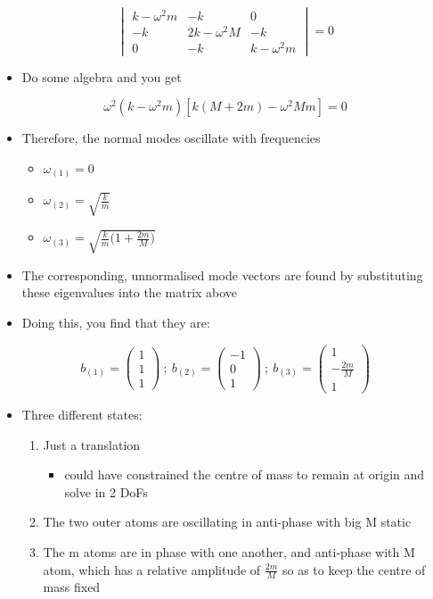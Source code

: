 \documentclass[a4paper,11pt,normalem]{article}
\begin{document}
\begin{example}
\[
    \begin{vmatrix} k - \omega^2 m & -k & 0 \\ -k & 2k - \omega^2 M & -k \\ 0 & -k & k - \omega^2 m \end{vmatrix} = 0
\]

\begin{itemize}
\item
  Do some algebra and you get
\end{itemize}

\[
    \omega^2 (k - \omega^2 m)[k(M + 2m) - \omega^2 Mm] = 0
\]

\begin{itemize}
\item
  Therefore, the normal modes oscillate with frequencies
  \begin{itemize}
  \item
    \(\omega_{(1)} = 0\)
  \item
    \(\omega_{(2)} = \sqrt{\frac{k}{m}}\)
  \item
    \(\omega_{(3)} = \sqrt{\frac{k}{m}\big(1 + \frac{2m}{M}\big)}\)
  \end{itemize}
\item
  The corresponding, unnormalised mode vectors are found by substituting
  these eigenvalues into the matrix above
\item
  Doing this, you find that they are:
\end{itemize}

\[
    b_{(1)} = \begin{pmatrix} 1 \\ 1 \\ 1 \end{pmatrix} ~;~ b_{(2)} = \begin{pmatrix} -1 \\ 0 \\ 1 \end{pmatrix} ~;~ b_{(3)} = \begin{pmatrix} 1 \\ -\frac{2m}{M} \\ 1 \end{pmatrix}
\]

\begin{itemize}
\item
  Three different states:
  \begin{enumerate}
  \item
    Just a translation
    \begin{itemize}
    \item
      could have constrained the centre of mass to remain at origin and
      solve in 2 DoFs
    \end{itemize}
  \item
    The two outer atoms are oscillating in anti-phase with big M static
  \item
    The m atoms are in phase with one another, and anti-phase with M
    atom, which has a relative amplitude of \(\frac{2m}{M}\) so as to
    keep the centre of mass fixed
  \end{enumerate}
\end{itemize}
\end{example}
\end{document}
